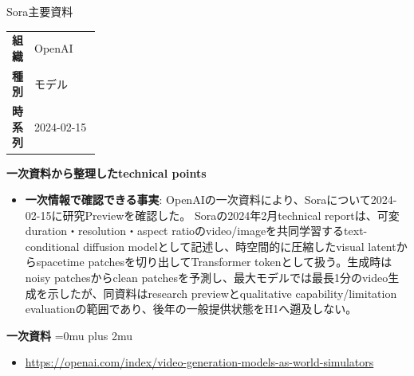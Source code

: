 \begin{technicalnote}{Sora}{主要資料}
\begingroup
\begin{tabularx}{\linewidth}{@{}>{\bfseries}p{0.22\linewidth}X@{}}
組織 & OpenAI \\
種別 & モデル \\
時系列 & 2024-02-15 \\
\end{tabularx}
\smallskip
\begin{minipage}{\linewidth}
{\bfseries 一次資料から整理したtechnical points}
\begin{itemize}[leftmargin=1.5em,itemsep=0.35em]
\item \textbf{一次情報で確認できる事実}: OpenAIの一次資料により、Soraについて2024-02-15に研究Previewを確認した。 Soraの2024年2月technical reportは、可変duration・resolution・aspect ratioのvideo/imageを共同学習するtext-conditional diffusion modelとして記述し、時空間的に圧縮したvisual latentからspacetime patchesを切り出してTransformer tokenとして扱う。生成時はnoisy patchesからclean patchesを予測し、最大モデルでは最長1分のvideo生成を示したが、同資料はresearch previewとqualitative capability/limitation evaluationの範囲であり、後年の一般提供状態をH1へ遡及しない。
\end{itemize}
\begin{minipage}{\linewidth}
\begin{samepage}
{\bfseries 一次資料}
\begingroup\sloppy
\Urlmuskip=0mu plus 2mu\relax
\begin{itemize}[leftmargin=1.5em,itemsep=0.25em]
\item {\scriptsize\url{https://openai.com/index/video-generation-models-as-world-simulators}}
\end{itemize}
\endgroup
\end{samepage}
\end{minipage}
\end{minipage}
\endgroup
\end{technicalnote}
\medskip

